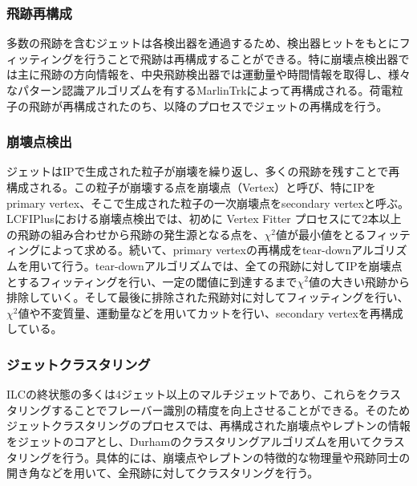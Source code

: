 \subsubsection{飛跡再構成}
多数の飛跡を含むジェットは各検出器を通過するため、検出器ヒットをもとにフィッティングを行うことで飛跡は再構成することができる。特に崩壊点検出器では主に飛跡の方向情報を、中央飛跡検出器では運動量や時間情報を取得し、様々なパターン認識アルゴリズムを有するMarlinTrkによって再構成される。荷電粒子の飛跡が再構成されたのち、以降のプロセスでジェットの再構成を行う。
\subsubsection{崩壊点検出}
ジェットはIPで生成された粒子が崩壊を繰り返し、多くの飛跡を残すことで再構成される。この粒子が崩壊する点を崩壊点（Vertex）と呼び、特にIPをprimary vertex、そこで生成された粒子の一次崩壊点をsecondary vertexと呼ぶ。LCFIPlusにおける崩壊点検出では、初めに Vertex Fitter プロセスにて2本以上の飛跡の組み合わせから飛跡の発生源となる点を、${\chi}^2$値が最小値をとるフィッティングによって求める。続いて、primary vertexの再構成をtear-downアルゴリズムを用いて行う。tear-downアルゴリズムでは、全ての飛跡に対してIPを崩壊点とするフィッティングを行い、一定の閾値に到達するまで${\chi}^2$値の大きい飛跡から排除していく。そして最後に排除された飛跡対に対してフィッティングを行い、 ${\chi}^2$値や不変質量、運動量などを用いてカットを行い、secondary vertexを再構成している。
\subsubsection{ジェットクラスタリング}
ILCの終状態の多くは4ジェット以上のマルチジェットであり、これらをクラスタリングすることでフレーバー識別の精度を向上させることができる。そのためジェットクラスタリングのプロセスでは、再構成された崩壊点やレプトンの情報をジェットのコアとし、Durham\cite{durham}のクラスタリングアルゴリズムを用いてクラスタリングを行う。具体的には、崩壊点やレプトンの特徴的な物理量や飛跡同士の開き角などを用いて、全飛跡に対してクラスタリングを行う。
